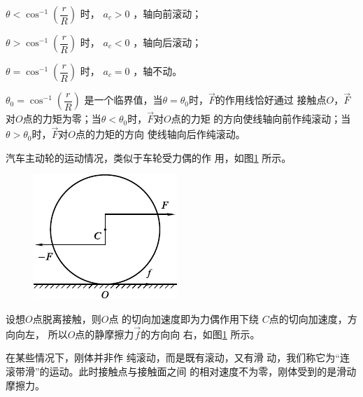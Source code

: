 $ \theta < \cos ^ { - 1 } \left( \dfrac { r } { R } \right) $ 时， $ a _ { c } > 0 $ ，轴向前滚动；

$ \theta > \cos ^ { - 1 } \left( \dfrac { r } { R } \right) $
时， $ a _ { c } < 0 $ ，轴向后滚动；

$ \theta = \cos ^ { - 1 } \left( \dfrac { r } { R } \right) $
时， $ a _ { c } = 0 $ ，轴不动。

\noindent
$ \theta _ { 0 } = \cos ^ { - 1 } \left( \dfrac { r } { R } \right) $
是一个临界值，当$ \theta = \theta_{ 0 } $时，$ \vec{F} $的作用线恰好通过
接触点$ O $，$\vec{F}$对$ O $点的力矩为零；当$ \theta < \theta_{ 0 } $时，$ \vec{F} $对$ O $点的力矩
的方向使线轴向前作纯滚动；当$ \theta > \theta _ { 0 } $时，$\vec{F}$对$ O $点的力矩的方向
使线轴向后作纯滚动。

\clearpage
\example 汽车主动轮的运动情况，类似于车轮受力偶的作
用，如图\ref{fig:10.20} 所示。

\begin{figure}
  \vspace{-1.56em}
  \centering
  \includegraphics{figure/fig10.20}
  \caption{}
  \label{fig:10.20}
\end{figure}
设想$ O $点脱离接触，则$ O $点
的切向加速度即为力偶作用下绕
$ C $点的切向加速度，方向向左，
所以$ O $点的静摩擦力$\vec{f}$的方向向
右，如图\ref{fig:10.20} 所示。

在某些情况下，刚体并非作
纯滚动，而是既有滚动，又有滑
动，我们称它为“连滚带滑”的运动。此时接触点与接触面之间
的相对速度不为零，刚体受到的是滑动摩擦力。
